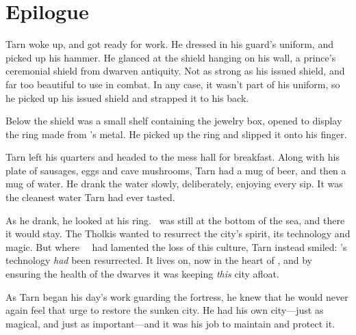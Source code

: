 \chapter*{Epilogue}

Tarn woke up, and got ready for work.  He dressed in his guard's uniform, and picked up his hammer.  He glanced at the shield hanging on his wall, a prince's ceremonial shield from dwarven antiquity.  Not as strong as his issued shield, and far too beautiful to use in combat.  In any case, it wasn't part of his uniform, so he picked up his issued shield and strapped it to his back.

Below the shield was a small shelf containing the jewelry box, opened to display the ring made from \kildir's metal.  He picked up the ring and slipped it onto his finger.

Tarn left his quarters and headed to the mess hall for breakfast.  Along with his plate of sausages, eggs and cave mushrooms, Tarn had a mug of beer, and then a mug of water.  He drank the water slowly, deliberately, enjoying every sip.  It was the cleanest water Tarn had ever tasted.

As he drank, he looked at his ring.  \valdunmir\ was still at the bottom of the sea, and there it would stay.  The Tholkis wanted to resurrect the city's spirit, its technology and magic.  But where \mothzam\ \driktur\ had lamented the loss of this culture, Tarn instead smiled: \valdunmir's technology \emph{had} been resurrected.  It lives on, now in the heart of \korbarthrond, and by ensuring the health of the dwarves it was keeping \emph{this} city afloat.

As Tarn began his day's work guarding the fortress, he knew that he would never again feel that urge to restore the sunken city.  He had his own city---just as magical, and just as important---and it was his job to maintain and protect it.